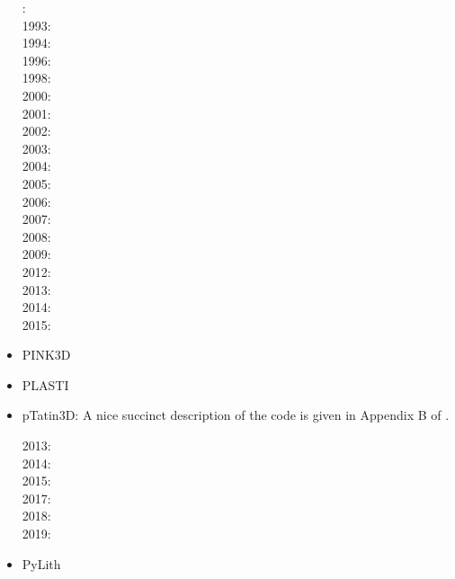 \begin{itemize}
: \cite{cund89}\cite{hoor89}\\
1993: \cite{pocp93}\cite{zhhj93}\\
1994: \cite{wizh94}\\
1996: \cite{hach96}\cite{zhho96}\\
1998: \cite{gepd98}\\
2000: \cite{labp00}\\
2001: \cite{bujl01}\cite{bupo01}\\
2002: \cite{bast02}\cite{clbb02}\\
2003: \cite{hags03}\cite{gehd03}\cite{upke03}\\
2004: \cite{guhl04}\cite{gewi04}\cite{toba04}\cite{tibb04}\cite{clbm04}\cite{tobj04}\\
2005: \cite{bugu05}\\
2006: \cite{buwa06}\\
2007: \cite{yaab07}\cite{buto07}\\
2008: \cite{yaba08}\cite{tibb08}\\
2009: \cite{gecm09}\cite{yahb09}\cite{bucl09}\cite{tigv09}\\
2012: \cite{anwb12}\cite{gech12}\cite{gubc12}\cite{gerb12}\\
2013: \cite{wabd13}\cite{frbm13}\cite{tibb13}\\
2014: \cite{frba14}\cite{gagb14}\cite{bufa14}\\
2015: \cite{wulc15}\cite{marl15}\cite{gebw15}\cite{svlh15}\\


\item PINK3D
\cite{vosc15}


\item PLASTI
\cite{fuwb06}



\item pTatin3D: A nice succinct description of the code is given in Appendix B of \cite{lemh17}. 

2013: \cite{phil13}\\
2014: \cite{mabl14}\\
2015: \cite{mabl15}\\
2017: \cite{lemh17}\\
2018: \cite{jolp18}\\
2019: \cite{jolm19}

\item PyLith 

\cite{aakw13}



\end{itemize}

